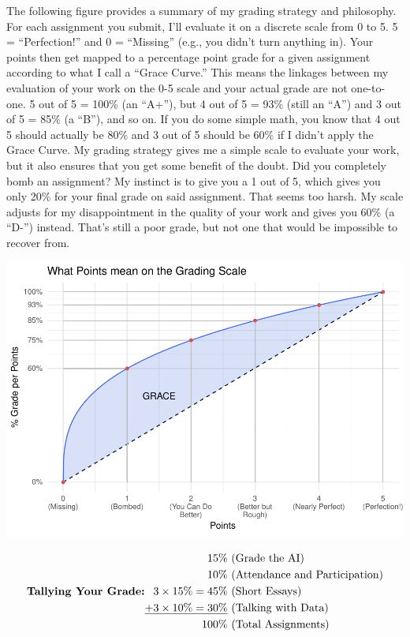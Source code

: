 \documentclass[11pt,]{article}
\makeatletter
\def\maxwidth{\ifdim\Gin@nat@width>\linewidth\linewidth
\else\Gin@nat@width\fi}
\let\Oldincludegraphics\includegraphics
\renewcommand{\includegraphics}[1]{\Oldincludegraphics[width=\maxwidth]{#1}}
\makeatother
\begin{document}
The following figure provides a summary of my grading strategy and
philosophy. For each assignment you submit, I'll evaluate it on a
discrete scale from 0 to 5. 5 = ``Perfection!'' and 0 = ``Missing''
(e.g., you didn't turn anything in). Your points then get mapped to a
percentage point grade for a given assignment according to what I call a
``Grace Curve.'' This means the linkages between my evaluation of your
work on the 0-5 scale and your actual grade are not one-to-one. 5 out of
5 = 100\% (an ``A+''), but 4 out of 5 = 93\% (still an ``A'') and 3 out
of 5 = 85\% (a ``B''), and so on. If you do some simple math, you know
that 4 out 5 should actually be 80\% and 3 out of 5 should be 60\% if I
didn't apply the Grace Curve. My grading strategy gives me a simple
scale to evaluate your work, but it also ensures that you get some
benefit of the doubt. Did you completely bomb an assignment? My instinct
is to give you a 1 out of 5, which gives you only 20\% for your final
grade on said assignment. That seems too harsh. My scale adjusts for my
disappointment in the quality of your work and gives you 60\% (a ``D-'')
instead. That's still a poor grade, but not one that would be impossible
to recover from.

\bigskip

\includegraphics{figs/unnamed-chunk-1.pdf}

\[
\textbf{Tallying Your Grade:}
\begin{aligned}
15\% & \text{ (Grade the AI)} \\
10\%  & \text{ (Attendance and Participation)} \\
3 \times 15\% = 45\%  & \text{ (Short Essays)} \\
\underline{+ \space 3 \times 10\% = 30\%} &  \text{ (Talking with Data)} \\
100\% & \text{ (Total Assignments)}
\end{aligned}
\]
\end{document}
